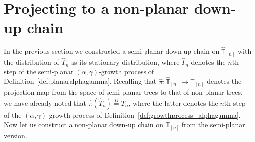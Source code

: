 \documentclass[a4paper, final]{amsart}
\theoremstyle{plain}
\theoremstyle{definition}
\newcommand{\That}[1][T]{\widehat{#1}}
\newcommand{\Thatspace}[1][\T]{\widehat{\boldsymbol{#1}}} %
\newcommand{\T}{\mathbb{T}}
\newcommand{\deq}{\stackrel{D}{=}}
\begin{document}
\section{Projecting to a non-planar down-up chain}
%
In the previous section we constructed a semi-planar down-up chain on $\Thatspace_{[n]}$ with the distribution of $\That_n$ as its stationary distribution, where $\That_n$ denotes the $n$th step of the semi-planar $(\alpha, \gamma)$-growth process of Definition~\ref{def:planaralphagamma}.
Recalling that $\hat{\pi} \colon \Thatspace_{[n]} \to \T_{[n]}$ denotes the projection map from the space of semi-planar trees to that of non-planar trees, we have already noted that $\hat{\pi} ( \That_n ) \deq T_n$, where the latter denotes the $n$th step of the $(\alpha, \gamma)$-growth process of Definition~\ref{def:growthprocess_alphagamma}.
Now let us construct a non-planar down-up chain on $\T_{[n]}$ from the semi-planar version.
\end{document}
